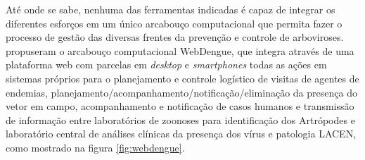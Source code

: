 Até onde se sabe, nenhuma das ferramentas indicadas é capaz de integrar os diferentes esforços em um único arcabouço computacional que permita fazer o processo de gestão das diversas frentes da prevenção e controle de arboviroses.  propuseram o arcabouço computacional WebDengue, que integra através de uma plataforma web com parcelas em \emph{desktop} e \emph{smartphones} todas as ações em sistemas próprios para o planejamento e controle logístico de visitas de agentes de endemias, planejamento/acompanhamento/notificação/eliminação da presença do vetor em campo, acompanhamento e notificação de casos humanos e transmissão de informação entre laboratórios de zoonoses para identificação dos Artrópodes e laboratório central de análises clínicas da presença dos vírus e patologia \acrshort{LACEN}, como mostrado na figura \ref{fig:webdengue}.


\begin{figure}[!ht]
	\centering
\end{figure}



